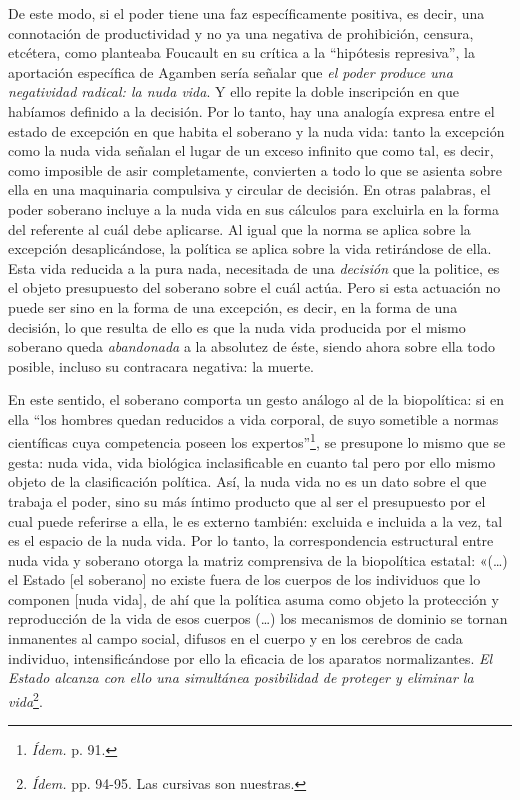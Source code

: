 De este modo, si el poder tiene una faz específicamente positiva, es decir, una connotación de productividad y no ya una negativa de prohibición, censura, etcétera, como planteaba Foucault en su crítica a la \enquote{hipótesis represiva}, la aportación específica de Agamben sería señalar que \emph{el poder produce una negatividad radical: la nuda vida}. Y ello repite la doble inscripción  en que habíamos definido a la decisión. Por lo tanto, hay una analogía expresa entre el estado de excepción en que habita el soberano y la nuda vida: tanto la excepción como la nuda vida señalan el lugar de un exceso infinito que como tal, es decir, como imposible de asir completamente, convierten a todo lo que se asienta sobre ella en una maquinaria compulsiva y circular de decisión. En otras palabras, el poder soberano incluye a la nuda vida en sus cálculos para excluirla en la forma del referente al cuál debe aplicarse. Al igual que la norma se aplica sobre la excepción desaplicándose, la política se aplica sobre la vida retirándose de ella. Esta vida reducida a la pura nada, necesitada de una \emph{decisión} que la politice, es el objeto presupuesto del soberano sobre el cuál actúa. Pero si esta actuación no puede ser sino en la forma de una excepción, es decir, en la forma de una decisión, lo que resulta de ello es que la nuda vida producida por el mismo soberano queda \emph{abandonada} a la absolutez de éste, siendo ahora sobre ella todo posible, incluso su contracara negativa: la muerte.

En este sentido, el soberano comporta un gesto análogo al de la biopolítica: si en ella \enquote{los hombres quedan reducidos a vida corporal, de suyo sometible a normas científicas cuya competencia poseen los expertos}\footnote{\emph{Ídem.} p. 91.}, se presupone lo mismo que se gesta: nuda vida, vida biológica inclasificable en cuanto tal pero por ello mismo objeto de la clasificación política. Así, la nuda vida no es un dato sobre el que trabaja el poder, sino su más íntimo producto que al ser el presupuesto por el cual puede referirse a ella, le es externo también: excluida e incluida a la vez, tal es el espacio de la nuda vida. Por lo tanto, la correspondencia estructural entre nuda vida y soberano otorga la matriz comprensiva de la biopolítica estatal: «(\dots) el Estado {[}el soberano{]} no existe fuera de los cuerpos de los individuos que lo componen {[}nuda vida{]}, de ahí que la política asuma como objeto la protección y reproducción de la vida de esos cuerpos (\dots) los mecanismos de dominio se tornan inmanentes al campo social, difusos en el cuerpo y en los cerebros de cada individuo, intensificándose por ello la eficacia de los aparatos normalizantes. \emph{El Estado alcanza con ello una simultánea posibilidad de proteger y eliminar la vida}\footnote{\emph{Ídem.} pp. 94-95. Las cursivas son nuestras.}.

